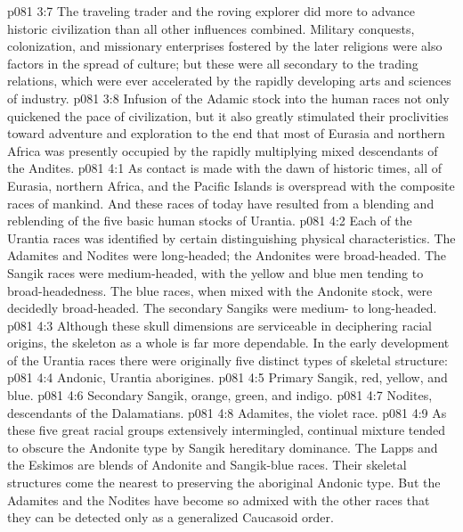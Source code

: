 \vs p081 3:7 The traveling trader and the roving explorer did more to advance historic civilization than all other influences combined. Military conquests, colonization, and missionary enterprises fostered by the later religions were also factors in the spread of culture; but these were all secondary to the trading relations, which were ever accelerated by the rapidly developing arts and sciences of industry.
\vs p081 3:8 Infusion of the Adamic stock into the human races not only quickened the pace of civilization, but it also greatly stimulated their proclivities toward adventure and exploration to the end that most of Eurasia and northern Africa was presently occupied by the rapidly multiplying mixed descendants of the Andites.
\vs p081 4:1 As contact is made with the dawn of historic times, all of Eurasia, northern Africa, and the Pacific Islands is overspread with the composite races of mankind. And these races of today have resulted from a blending and reblending of the five basic human stocks of Urantia.
\vs p081 4:2 Each of the Urantia races was identified by certain distinguishing physical characteristics. The Adamites and Nodites were long\hyp{}headed; the Andonites were broad\hyp{}headed. The Sangik races were medium\hyp{}headed, with the yellow and blue men tending to broad\hyp{}headedness. The blue races, when mixed with the Andonite stock, were decidedly broad\hyp{}headed. The secondary Sangiks were medium\hyp{} to long\hyp{}headed.
\vs p081 4:3 Although these skull dimensions are serviceable in deciphering racial origins, the skeleton as a whole is far more dependable. In the early development of the Urantia races there were originally five distinct types of skeletal structure:
\vs p081 4:4 \bibnobreakspace Andonic, Urantia aborigines.
\vs p081 4:5 \bibnobreakspace Primary Sangik, red, yellow, and blue.
\vs p081 4:6 \bibnobreakspace Secondary Sangik, orange, green, and indigo.
\vs p081 4:7 \bibnobreakspace Nodites, descendants of the Dalamatians.
\vs p081 4:8 \bibnobreakspace Adamites, the violet race.
\vs p081 4:9 \pc As these five great racial groups extensively intermingled, continual mixture tended to obscure the Andonite type by Sangik hereditary dominance. The Lapps and the Eskimos are blends of Andonite and Sangik\hyp{}blue races. Their skeletal structures come the nearest to preserving the aboriginal Andonic type. But the Adamites and the Nodites have become so admixed with the other races that they can be detected only as a generalized Caucasoid order.
